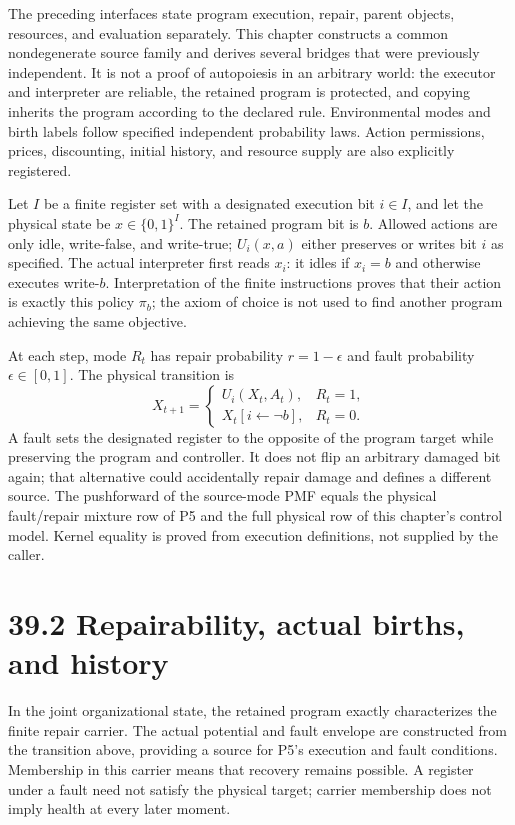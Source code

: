 \documentclass[
  english,
  11pt,
  oneside]{book}
\begin{document}
The preceding interfaces state program execution, repair, parent objects, resources, and evaluation separately. This chapter constructs a common nondegenerate source family and derives several bridges that were previously independent. It is not a proof of autopoiesis in an arbitrary world: the executor and interpreter are reliable, the retained program is protected, and copying inherits the program according to the declared rule. Environmental modes and birth labels follow specified independent probability laws. Action permissions, prices, discounting, initial history, and resource supply are also explicitly registered.

Let \(I\) be a finite register set with a designated execution bit \(i\in I\), and let the physical state be \(x\in\{0,1\}^I\). The retained program bit is \(b\). Allowed actions are only idle, write-false, and write-true; \(U_i(x,a)\) either preserves or writes bit \(i\) as specified. The actual interpreter first reads \(x_i\): it idles if \(x_i=b\) and otherwise executes write-\(b\). Interpretation of the finite instructions proves that their action is exactly this policy \(\pi_b\); the axiom of choice is not used to find another program achieving the same objective.

At each step, mode \(R_t\) has repair probability \(r=1-\epsilon\) and fault probability \(\epsilon\in[0,1]\). The physical transition is \[X_{t+1}=\begin{cases}
U_i(X_t,A_t),&R_t=1,\\
X_t[i\leftarrow\neg b],&R_t=0.
\end{cases}\] A fault sets the designated register to the opposite of the program target while preserving the program and controller. It does not flip an arbitrary damaged bit again; that alternative could accidentally repair damage and defines a different source. The pushforward of the source-mode PMF equals the physical fault/repair mixture row of P5 and the full physical row of this chapter's control model. Kernel equality is proved from execution definitions, not supplied by the caller.

\section{39.2 Repairability, actual births, and history}\label{repairability-actual-births-and-history}

In the joint organizational state, the retained program exactly characterizes the finite repair carrier. The actual potential and fault envelope are constructed from the transition above, providing a source for P5's execution and fault conditions. Membership in this carrier means that recovery remains possible. A register under a fault need not satisfy the physical target; carrier membership does not imply health at every later moment.
\end{document}
